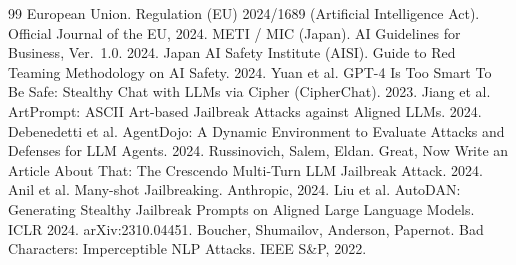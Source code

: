 \documentclass[10pt]{article}
\begin{document}
\begin{thebibliography}{99}
 European Union. Regulation (EU) 2024/1689 (Artificial
  Intelligence Act). Official Journal of the EU, 2024.
 METI / MIC (Japan). AI Guidelines for Business, Ver.~1.0. 2024.
 Japan AI Safety Institute (AISI). Guide to Red Teaming Methodology
  on AI Safety. 2024.
 Yuan et al. GPT-4 Is Too Smart To Be Safe: Stealthy Chat with
  LLMs via Cipher (CipherChat). 2023.
 Jiang et al. ArtPrompt: ASCII Art-based Jailbreak Attacks
  against Aligned LLMs. 2024.
 Debenedetti et al. AgentDojo: A Dynamic Environment to
  Evaluate Attacks and Defenses for LLM Agents. 2024.
 Russinovich, Salem, Eldan. Great, Now Write an Article About
  That: The Crescendo Multi-Turn LLM Jailbreak Attack. 2024.
 Anil et al. Many-shot Jailbreaking. Anthropic, 2024.
 Liu et al. AutoDAN: Generating Stealthy Jailbreak Prompts on
  Aligned Large Language Models. ICLR 2024. arXiv:2310.04451.
 Boucher, Shumailov, Anderson, Papernot. Bad Characters:
  Imperceptible NLP Attacks. IEEE S\&P, 2022.
\end{thebibliography}
\end{document}
